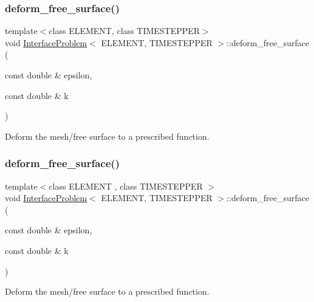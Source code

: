 \subsubsection{\texorpdfstring{deform\+\_\+free\+\_\+surface()}{deform\_free\_surface()}\hspace{0.1cm}{\footnotesize\ttfamily [1/2]}}
{\footnotesize\ttfamily template$<$class E\+L\+E\+M\+E\+NT, class T\+I\+M\+E\+S\+T\+E\+P\+P\+ER$>$ \\
void \hyperlink{classInterfaceProblem}{Interface\+Problem}$<$ E\+L\+E\+M\+E\+NT, T\+I\+M\+E\+S\+T\+E\+P\+P\+ER $>$\+::deform\+\_\+free\+\_\+surface (\begin{DoxyParamCaption}\item[{const double \&}]{epsilon,  }\item[{const double \&}]{k }\end{DoxyParamCaption})\hspace{0.3cm}{\ttfamily [private]}}



Deform the mesh/free surface to a prescribed function. 

\mbox{\label{classInterfaceProblem_aa93d492461ac53f0d9f88516bce322dc}} 
\subsubsection{\texorpdfstring{deform\+\_\+free\+\_\+surface()}{deform\_free\_surface()}\hspace{0.1cm}{\footnotesize\ttfamily [2/2]}}
{\footnotesize\ttfamily template$<$class E\+L\+E\+M\+E\+NT , class T\+I\+M\+E\+S\+T\+E\+P\+P\+ER $>$ \\
void \hyperlink{classInterfaceProblem}{Interface\+Problem}$<$ E\+L\+E\+M\+E\+NT, T\+I\+M\+E\+S\+T\+E\+P\+P\+ER $>$\+::deform\+\_\+free\+\_\+surface (\begin{DoxyParamCaption}\item[{const double \&}]{epsilon,  }\item[{const double \&}]{k }\end{DoxyParamCaption})\hspace{0.3cm}{\ttfamily [private]}}



Deform the mesh/free surface to a prescribed function. 



